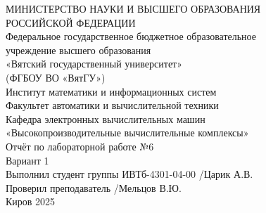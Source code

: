 \documentclass[a4paper, 12pt]{extarticle}
\begin{document}
\pagestyle{empty}

\begin{center}
	МИНИСТЕРСТВО НАУКИ И ВЫСШЕГО ОБРАЗОВАНИЯ \\
	РОССИЙСКОЙ ФЕДЕРАЦИИ \\
	Федеральное государственное бюджетное образовательное \\
	учреждение высшего образования \\
	«Вятский государственный университет» \\
	(ФГБОУ ВО «ВятГУ») \\
	Институт математики и информационных систем \\
	Факультет автоматики и вычислительной техники \\
	Кафедра электронных вычислительных машин \\
	\vspace{50mm}
	«Высокопроизводительные вычислительные комплексы» \\
	Отчёт по лабораторной работе №6 \\
    Вариант 1\\
	\vspace{110mm}
	Выполнил студент группы ИВТб-4301-04-00 \underline{\hspace{38mm}}/Царик А.В. \\
	Проверил преподаватель \underline{\hspace{74.5mm}}/Мельцов В.Ю. \\
	\vfill
	{Киров 2025}
\end{center}
\end{document}
